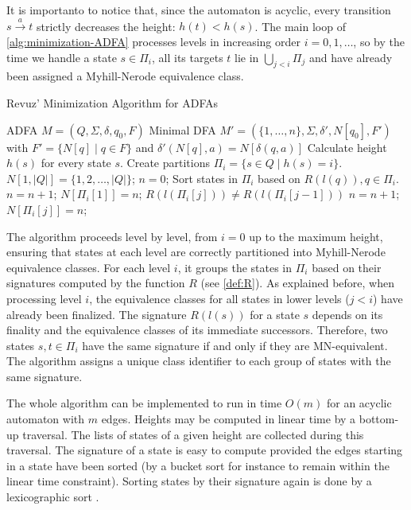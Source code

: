 It is importanto to notice that, since the automaton is acyclic, every transition $s \xrightarrow{a} t$ strictly decreases the height: $h(t) < h(s)$. The main loop of \cref{alg:minimization-ADFA} processes levels in increasing order $i=0,1,\dots$, so by the time we handle a state $s\in\Pi_i$, all its targets $t$ lie in $\bigcup_{j<i}\Pi_j$ and have already been assigned a Myhill-Nerode equivalence class.

\begin{algorithm}[H]
    \caption{Revuz' Minimization Algorithm for ADFAs}
    \label{alg:minimization-ADFA}
    \begin{algorithmic}[1]
    \Require ADFA $M=(Q,\Sigma,\delta,q_0,F)$
    \Ensure Minimal DFA $M'=(\{1,\dots,n\},\Sigma,\delta',N[q_0],F')$ with $F'=\{N[q]\mid q\in F\}$ and $\delta'(N[q],a)=N[\delta(q,a)]$
    \State Calculate height $h(s)$ for every state $s$.
    \State Create partitions $\Pi_i = \{s \in Q \mid h(s) = i\}$.
    \State $N[1, |Q|] = \{1,2,\dots,|Q|\}$; 
    \State $n = 0$; 
     
        \State Sort states in $\Pi_i$ based on $R(l(q)), q\in \Pi_i$.
        \State $n = n + 1$;
        \State $N[\Pi_i[1]] = n$;
            \If $R(l(\Pi_i[j])) \ne R(l(\Pi_i[j-1]))$
                \State $n = n + 1$;
            \EndIf
            \State $N[\Pi_i[j]] = n$;
        \EndFor
    \EndFor
    \end{algorithmic}
\end{algorithm}

The algorithm proceeds level by level, from $i=0$ up to the maximum height, ensuring that states at each level are correctly partitioned into Myhill-Nerode equivalence classes. For each level $i$, it groups the states in $\Pi_i$ based on their signatures computed by the function $R$ (see \cref{def:R}). As explained before, when processing level $i$, the equivalence classes for all states in lower levels ($j < i$) have already been finalized. The signature $R(l(s))$ for a state $s$ depends on its finality and the equivalence classes of its immediate successors. Therefore, two states $s, t \in \Pi_i$ have the same signature if and only if they are MN-equivalent. The algorithm assigns a unique class identifier to each group of states with the same signature.

The whole algorithm can be implemented to run in time $O(m)$ for an acyclic automaton with $m$ edges. Heights may be computed in linear time by
a bottom-up traversal. The lists of states of a given height are collected during this traversal. The signature of a state is easy to compute provided the edges starting in a state have
been sorted (by a bucket sort for instance to remain within the linear time constraint).
Sorting states by their signature again is done by a lexicographic sort \cite{berstel2010minimization}. 

